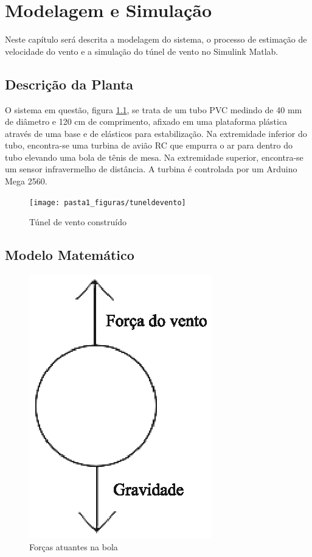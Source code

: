 \chapter{Modelagem e Simulação} \label{cap3}

Neste capítulo será descrita a modelagem do sistema, o processo de estimação de velocidade do vento e a simulação do túnel de vento no Simulink Matlab.

\section{Descrição da Planta}
O sistema em questão, figura \ref{fig:tuneldevento}, se trata de um tubo PVC medindo de 40 mm de diâmetro e 120 cm de comprimento, afixado em uma plataforma plástica através de uma base e de elásticos para estabilização. Na extremidade inferior do tubo, encontra-se uma turbina de avião RC que empurra o ar para dentro do tubo elevando uma bola de tênis de mesa. Na extremidade superior, encontra-se um sensor infravermelho de distância. A turbina é controlada por um Arduino Mega 2560.

\begin{figure}
	\centering
	\texttt{[image: pasta1\_figuras/tuneldevento]}
	\caption[Túnel de vento construído]{Túnel de vento construído}
	\label{fig:tuneldevento}
\end{figure}


\section{Modelo Matemático}


\begin{figure}[htb]
	\centering
	\includegraphics[width=0.3\linewidth]{pasta1_figuras/forcasatuantes}
	\caption[Forças atuantes na bola]{Forças atuantes na bola}
	\label{fig:forcasatuantes}
\end{figure}



